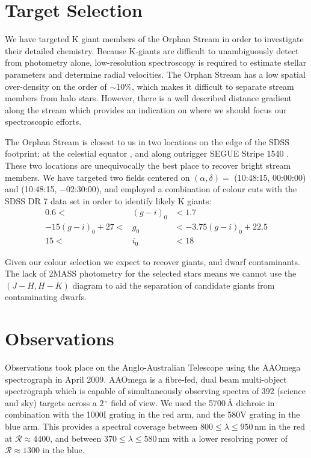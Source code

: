 \documentclass{emulateapj}
\begin{document}
\section{Target Selection}
\label{sec:target-selection}

We have targeted K giant members of the Orphan Stream in order to investigate their detailed chemistry. Because K-giants are difficult to unambiguously detect from photometry alone, low-resolution spectroscopy is required to estimate stellar parameters and determine radial velocities. The Orphan Stream has a low spatial over-density on the order of $\sim$10\%, which makes it difficult to separate stream members from halo stars. However, there is a well described distance gradient along the stream \citep{Belokurov;et-al_2007, Newberg;et-al_2010} which provides an indication on where we should focus our spectroscopic efforts.

The Orphan Stream is closest to us in two locations on the edge of the SDSS footprint: at the celestial equator \citep{Belokurov;et-al_2007}, and along outrigger SEGUE Stripe 1540 \citep{Newberg;et-al_2010}. These two locations are unequivocally the best place to recover bright stream members. We have targeted two fields centered on $(\alpha, \delta) =$ (10:48:15, 00:00:00) and (10:48:15, $-$02:30:00), and employed a combination of colour cuts with the SDSS DR 7 \citep{Abazajian;et-al_2009} data set in order to identify likely K giants:
\begin{eqnarray}
0.6 <& (g-i)_0 &< 1.7 \\
-15(g-i)_0 + 27 <& g_0 &< -3.75(g-i)_0 + 22.5 \\
15  <& i_0  &< 18 
\end{eqnarray}

Given our colour selection we expect to recover giants, and dwarf contaminants. The lack of 2MASS photometry for the selected stars means we cannot use the $(J-H, H-K)$ diagram to aid the separation of candidate giants from contaminating dwarfs.

\section{Observations}
\label{sec:observations}

Observations took place on the Anglo-Australian Telescope using the AAOmega spectrograph in April 2009. AAOmega is a fibre-fed, dual beam multi-object spectrograph which is capable of simultaneously observing spectra of 392 (science and sky) targets across a $2\,^\circ$ field of view. We used the 5700\,{\AA} dichroic in combination with the 1000I grating in the red arm, and the 580V grating in the blue arm. This provides a spectral coverage between $800 \leq \lambda \leq 950$\,nm in the red at $\mathcal{R} \approx 4400$, and between $370 \leq \lambda \leq 580$\,nm with a lower resolving power of $\mathcal{R} \approx 1300$ in the blue.
\end{document}
